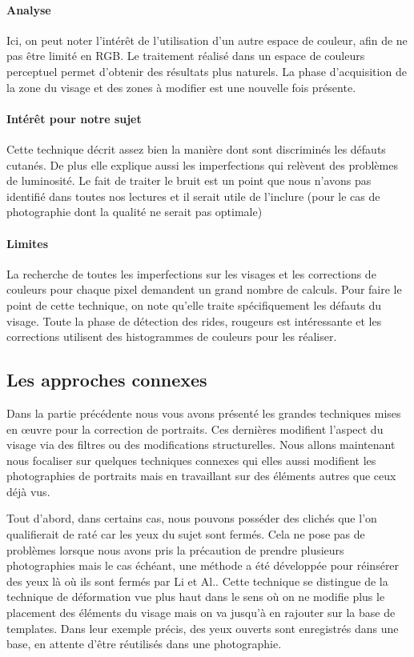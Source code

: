 \documentclass[11pt, french,screen]{report-rd-info}
\begin{document}
\paragraph{Analyse}
Ici, on peut noter l'intérêt de l'utilisation d'un autre espace de couleur, afin de ne pas être limité en RGB. Le traitement réalisé dans un espace de couleurs perceptuel permet d'obtenir des résultats plus naturels. La phase d'acquisition de la zone du visage et des zones à modifier est une nouvelle fois présente.
\paragraph{Intérêt pour notre sujet}
Cette technique décrit assez bien la manière dont sont discriminés les défauts cutanés. De plus elle explique aussi les imperfections qui relèvent des problèmes de luminosité. Le fait de traiter le bruit est un point que nous n’avons pas identifié dans toutes nos lectures et il serait utile de l’inclure (pour le cas de photographie dont la qualité ne serait pas optimale)
\paragraph{Limites}
La recherche de toutes les imperfections sur les visages et les corrections de couleurs pour chaque pixel demandent un grand nombre de calculs.
Pour faire le point de cette technique, on note qu’elle traite spécifiquement les défauts du visage. Toute la phase de détection des rides, rougeurs est intéressante et les corrections utilisent des histogrammes de couleurs pour les réaliser.
\subsection{Les approches connexes}
Dans la partie précédente nous vous avons présenté les grandes techniques mises en œuvre pour la correction de portraits. Ces dernières modifient l’aspect du visage via des filtres ou des modifications structurelles. Nous allons maintenant nous focaliser sur quelques techniques connexes qui elles aussi modifient les photographies de portraits mais en travaillant sur des éléments autres que ceux déjà vus.

Tout d’abord, dans certains cas, nous pouvons posséder des clichés que l'on qualifierait de raté car les yeux du sujet sont fermés. Cela ne pose pas de problèmes lorsque nous avons pris la précaution de prendre plusieurs photographies mais le cas échéant, une méthode a été développée pour réinsérer des yeux là où ils sont fermés par Li et Al.\cite{Li2011}. Cette technique se distingue de la technique de déformation vue plus haut dans le sens où on ne modifie plus le placement des éléments du visage mais on va jusqu'à en rajouter sur la base de templates. Dans leur exemple précis, des yeux ouverts sont enregistrés dans une base, en attente d’être réutilisés dans une photographie.
\end{document}
